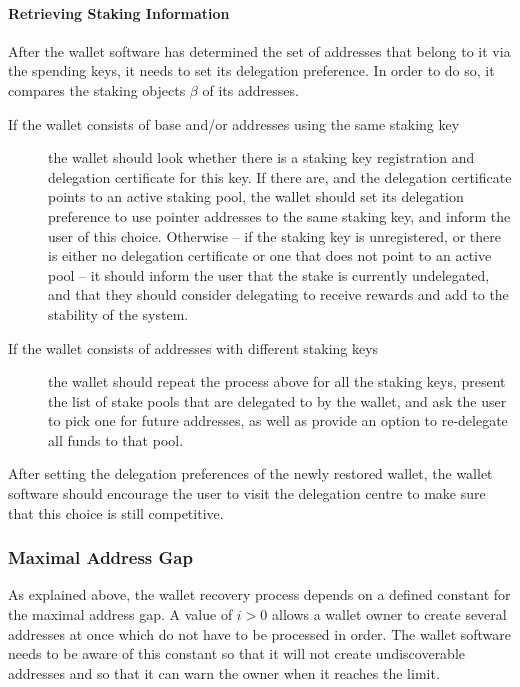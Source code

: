 \documentclass[11pt,a4paper,dvipsnames,twosided]{article}
\begin{document}
\paragraph{Retrieving Staking Information}
\label{retrieving-staking-information}

After the wallet software has determined the set of addresses that
belong to it via the spending keys, it needs to set its delegation
preference. In order to do so, it compares the staking objects \(\beta\)
of its addresses.

\begin{description}
\item[If the wallet consists of base and/or addresses using the same
  staking key] the wallet should look whether there is a staking key
  registration and delegation certificate for this key. If there are,
  and the delegation certificate points to an active staking pool, the
  wallet should set its delegation preference to use pointer addresses
  to the same staking key, and inform the user of this
  choice. Otherwise -- if the staking key is unregistered, or there is
  either no delegation certificate or one that does not point to an
  active pool -- it should inform the user that the stake is currently
  undelegated, and that they should consider delegating to receive
  rewards and add to the stability of the system.

\item[If the wallet consists of addresses with different staking keys]
  the wallet should repeat the process above for all the staking keys,
  present the list of stake pools that are delegated to by the wallet,
  and ask the user to pick one for future addresses, as well as
  provide an option to re-delegate all funds to that pool.
\end{description}

After setting the delegation preferences of the newly restored wallet,
the wallet software should encourage the user to visit the delegation
centre to make sure that this choice is still competitive.

\subsubsection{Maximal Address Gap}
\label{maximal-address-gap}

As explained above, the wallet recovery process depends on a defined
constant for the maximal address gap. A value of \(i>0\) allows a wallet
owner to create several addresses at once which do not have to be
processed in order. The wallet software needs to be aware of this
constant so that it will not create undiscoverable addresses and so that
it can warn the owner when it reaches the limit.
\end{document}
